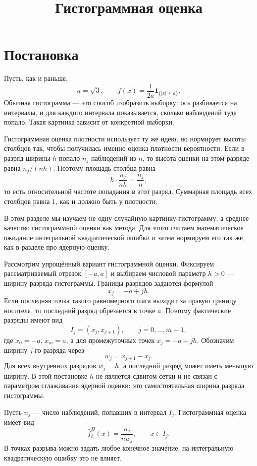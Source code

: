 \documentclass[12pt,a4paper]{article}
\begin{document}
\title{Гистограммная оценка}
\author{}
\date{}
\maketitle

\section*{Постановка}

Пусть, как и раньше,
\[
a=\sqrt{3},\qquad
f(x)=\frac{1}{2a}\mathbf{1}_{\{|x|\le a\}}.
\]
Обычная гистограмма --- это способ изобразить выборку: ось разбивается на
интервалы, и для каждого интервала показывается, сколько наблюдений туда
попало. Такая картинка зависит от конкретной выборки.

Гистограммная оценка плотности использует ту же идею, но нормирует высоты
столбцов так, чтобы получилась именно оценка плотности вероятности. Если в
разряд ширины $h$ попало $n_j$ наблюдений из $n$, то высота оценки на этом
разряде равна $n_j/(nh)$. Поэтому площадь столбца равна
\[
h\cdot\frac{n_j}{nh}=\frac{n_j}{n},
\]
то есть относительной частоте попадания в этот разряд. Суммарная площадь
всех столбцов равна $1$, как и должно быть у плотности.

В этом разделе мы изучаем не одну случайную картинку-гистограмму, а среднее
качество гистограммной оценки как метода. Для этого считаем математическое
ожидание интегральной квадратической ошибки и затем нормируем его так же,
как в разделе про ядерную оценку.

Рассмотрим упрощённый вариант гистограммной оценки. Фиксируем
рассматриваемый отрезок $[-a,a]$ и выбираем числовой параметр $h>0$ ---
ширину разряда гистограммы. Границы разрядов задаются формулой
\[
x_j=-a+jh.
\]
Если последняя точка такого равномерного шага выходит за правую границу
носителя, то последний разряд обрезается в точке $a$. Поэтому фактические
разряды имеют вид
\[
I_j=(x_j,x_{j+1}),\qquad j=0,\ldots,m-1,
\]
где $x_0=-a$, $x_m=a$, а для промежуточных точек $x_j=-a+jh$.
Обозначим ширину $j$-го разряда через
\[
w_j=x_{j+1}-x_j.
\]
Для всех внутренних разрядов $w_j=h$, а последний разряд может иметь
меньшую ширину. В этой постановке $h$ не является сдвигом сетки и не
связан с параметром сглаживания ядерной оценки: это самостоятельная ширина
разряда гистограммы.

Пусть $n_j$ --- число наблюдений, попавших в интервал $I_j$.
Гистограммная оценка имеет вид
\[
\widehat f^H_h(x)=\frac{n_j}{nw_j},
\qquad x\in I_j.
\]
В точках разрыва можно задать любое конечное значение: на интегральную
квадратическую ошибку это не влияет.
\end{document}
